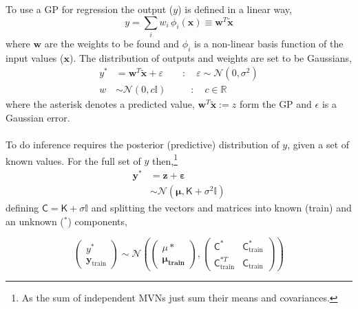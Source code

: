 \documentclass[a4paper,10.5pt]{article}
\begin{document}
To use a GP for regression the output ($y$) is defined in a linear way,
\begin{equation}
	y = \sum_i w_i \,\phi_i(\boldsymbol{x}) \equiv \boldsymbol{w}^T\tilde{\boldsymbol{x}}
\end{equation}
where $\boldsymbol{w}$ are the weights to be found and $\phi_i$ is a non-linear basis function of the input values ($\boldsymbol{x}$). The distribution of outputs and weights are set to be Gaussians,
\begin{equation}
	\begin{aligned}
		y^* &= \boldsymbol{w}^T\tilde{\boldsymbol{x}} + \varepsilon \qquad : \quad
		\varepsilon \sim \mathcal{N}(0, \sigma^2)\\
		w &\sim \mathcal{N}(0, c\mathbb{I})  \qquad\;\; : \quad c \in \mathbb{R}
	\end{aligned}	
\end{equation}
where the asterisk denotes a predicted value, $\boldsymbol{w}^T\tilde{\boldsymbol{x}} := z$ form the GP and $\epsilon$ is a Gaussian error.
\\\\
To do inference requires the posterior (predictive) distribution of $y$, given a set of known values. For the full set of $y$ then,\footnote{As the sum of independent MVNs just sum their means and covariances.}
\begin{equation}
	\begin{aligned}
		\boldsymbol{y}^* &= \boldsymbol{z} + \boldsymbol{\varepsilon} \\
		&\sim \mathcal{N}(\boldsymbol{\mu}, \mathsf{K} + \sigma^2\mathbb{I})
	\end{aligned}
\end{equation} 
defining $\mathsf{C} = \mathsf{K} + \sigma\mathbb{I}$ and splitting the vectors and matrices into known (train) and an unknown (${}^*$) components,

\begin{equation}
	\begin{pmatrix}
		y^*\\
		\boldsymbol{y}_\text{train}
	\end{pmatrix}
	\sim \mathcal{N}\left(
		\begin{pmatrix}
			\mu*\\
			\boldsymbol{\mu_\text{train}}
		\end{pmatrix}
	,
	\begin{pmatrix}
		\mathsf{C}^* & \mathsf{C}^*_\text{train} \\
		\mathsf{C}^{* T}_\text{train} & \mathsf{C}_\text{train}
	\end{pmatrix}
	\right)
\end{equation}
\end{document}
